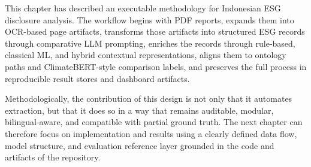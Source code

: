 This chapter has described an executable methodology for Indonesian ESG disclosure analysis. The workflow begins with PDF reports, expands them into OCR-based page artifacts, transforms those artifacts into structured ESG records through comparative LLM prompting, enriches the records through rule-based, classical ML, and hybrid contextual representations, aligns them to ontology paths and ClimateBERT-style comparison labels, and preserves the full process in reproducible result stores and dashboard artifacts.

Methodologically, the contribution of this design is not only that it automates extraction, but that it does so in a way that remains auditable, modular, bilingual-aware, and compatible with partial ground truth. The next chapter can therefore focus on implementation and results using a clearly defined data flow, model structure, and evaluation reference layer grounded in the code and artifacts of the repository.
